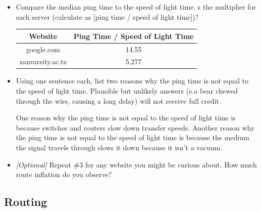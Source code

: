 \documentclass[10pt]{article}
\begin{document}
\begin{enumerate}
\begin{itemize}

\item Compare the median ping time to the speed of light time. s the multiplier for each server (calculate as [ping time / speed of light time])?

\begin{center}
\begin{tabular}{ || c | c || }
\hline
Website & Ping Time / Speed of Light Time \\
\hline \hline
google.com & 14.55 \\
\hline
zanvarsity.ac.tz & 5.277 \\
\hline
\end{tabular}
\end{center}

\item Using one sentence each, list two reasons why the ping time is not equal to the speed of light time. Plausible but unlikely answers (e.a bear chewed through the wire, causing a long delay) will not receive full credit.

One reason why the ping time is not equal to the speed of light time is because switches and routers slow down transfer speeds. Another reason why the ping time is not equal to the speed of light time is because the medium the signal travels through slows it down because it isn't a vacuum.

\item \emph{[Optional]} Repeat \#3 for any website you might be curious about. How much route inflation do you observe? 

\end{itemize}
\end{enumerate}

\newpage
\subsection*{Routing}
\end{document}
